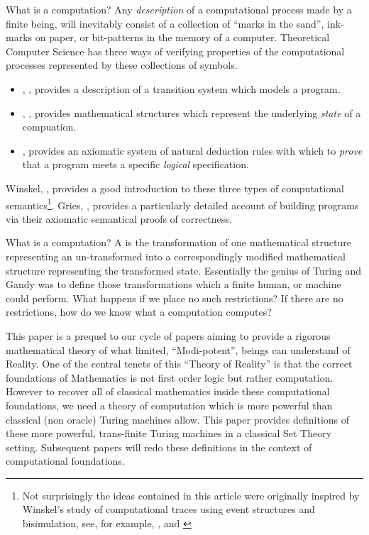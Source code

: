 \documentclass[a4paper,openany]{amsart}
\begin{document}
What is a computation? Any \emph{description} of a computational process made by a finite
being, will inevitably consist of a collection of ``marks in the sand'', ink-marks on
paper, or bit-patterns in the memory of a computer. Theoretical Computer Science has three
ways of verifying properties of the computational processes represented by these
collections of symbols. 
%
\begin{itemize}
%
\item {},
\cite{plotkin1981structuralOperationalSemantics}, provides a description of a transition 
system which models a program.
%
\item {}, \cite{scott1970theoryComputation, stoy1981scottStracheyTheory}, provides
mathematical structures which represent the underlying \emph{state} of a compuation.
%
\item {}, \cite{floyd1967programSemantics, 
hoare1969axiomaticSemantics} provides an axiomatic system of natural deduction rules with 
which to \emph{prove} that a program meets a specific \emph{logical} specification.
%
\end{itemize}
%
Winskel, \cite{winskel1993formalSemanticsProgrammingLanguages}, provides a good
introduction to these three types of computational semantics\footnote{Not surprisingly the
ideas contained in this article were originally inspired by Winskel's study of
computational traces using event structures and bisimulation, see, for example,
\cite{winskel2007eventStructures}, and \cite{joyalNielsenWinskel1996bisimulation}}. Gries,
\cite{gries1981scienceProgramming}, provides a particularly detailed account of building
programs via their axiomatic semantical proofs of correctness.

What is a computation? A  is the transformation of one mathematical
structure representing an un-transformed  into a correspondingly modified
mathematical structure representing the transformed state. Essentially the genius of
Turing and Gandy was to define those transformations which a finite human, or machine
could perform. What happens if we place no such restrictions? If there are no
restrictions, how do we know what a computation computes?


This paper is a prequel to our cycle of papers aiming to provide a rigorous mathematical
theory of what limited, ``Modi-potent'', beings can understand of Reality. One of the
central tenets of this ``Theory of Reality'' is that the correct foundations of
Mathematics is not first order logic but rather computation. However to recover all of
classical mathematics inside these computational foundations, we need a theory of
computation which is more powerful than classical (non oracle) Turing machines allow. This
paper provides definitions of these more powerful, trans-finite Turing machines in a
classical Set Theory setting. Subsequent papers will redo these definitions in the context
of computational foundations.
\end{document}
